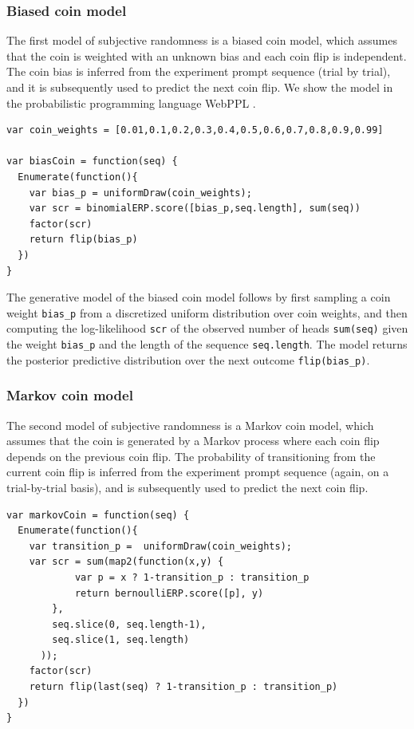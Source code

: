 \documentclass{article}
\begin{document}
\subsubsection{Biased coin model}
\label{s:tutorial:sss:biased}

The first model of subjective randomness is a biased coin model, which assumes that the coin is weighted with an unknown bias and each coin flip is independent. The coin bias is inferred from the experiment prompt sequence (trial by trial), and it is subsequently used to predict the next coin flip. We show the model in the probabilistic programming language WebPPL \cite{dippl}.

\begin{lstlisting}[caption=Biased coin model]
var coin_weights = [0.01,0.1,0.2,0.3,0.4,0.5,0.6,0.7,0.8,0.9,0.99]

var biasCoin = function(seq) {
  Enumerate(function(){
    var bias_p = uniformDraw(coin_weights);
    var scr = binomialERP.score([bias_p,seq.length], sum(seq))
    factor(scr)
    return flip(bias_p)
  })
}
\end{lstlisting}

The generative model of the biased coin model follows by first sampling a coin weight \lstinline{bias_p} from a discretized uniform distribution over coin weights, and then computing the log-likelihood \lstinline{scr} of the observed number of heads \lstinline{sum(seq)} given the weight \lstinline{bias_p} and the length of the sequence \lstinline{seq.length}. The model returns the posterior predictive distribution over the next outcome \lstinline{flip(bias_p)}.



\subsubsection{Markov coin model}
\label{s:tutorial:sss:markov}
The second model of subjective randomness is a Markov coin model, which assumes that the coin is generated by a Markov process where each coin flip depends on the previous coin flip. The probability of transitioning from the current coin flip is inferred from the experiment prompt sequence (again, on a trial-by-trial basis), and is subsequently used to predict the next coin flip.

\begin{lstlisting}[caption=Markov coin model]
var markovCoin = function(seq) {
  Enumerate(function(){
    var transition_p =  uniformDraw(coin_weights);
    var scr = sum(map2(function(x,y) {
    		var p = x ? 1-transition_p : transition_p
     	 	return bernoulliERP.score([p], y)
    	}, 
    	seq.slice(0, seq.length-1),
    	seq.slice(1, seq.length)
	  ));
    factor(scr)
    return flip(last(seq) ? 1-transition_p : transition_p)
  })
}
\end{lstlisting}
\end{document}
